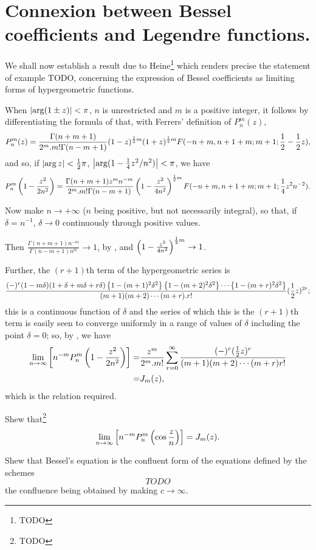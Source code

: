 \documentclass{book}
\begin{document}
\section{Connexion between Bessel coefficients and Legendre
  functions.}
We shall now establish a result due to Heine\footnote{TODO} which
renders precise the statement of  example
TODO, concerning the expression of Bessel coefficients as limiting
forms of hypergeometric functions.

When $\left| \arg(1\pm z) \right| < \pi$, $n$ is unrestricted and $m$ is a
positive integer, it follows by differentiating the formula of
 that, with Ferrers' definition of
$P_n^{m}(z)$,
$$
P_n^{m}(z)
=
\frac{\Gamma(n+m+1)}{2^m . m! \Gamma(n-m+1)}
(1-z)^{\frac{1}{2} m}
(1+z)^{\frac{1}{2} m}
F(-n+m,n+1+m; m+1; \frac{1}{2} - \frac{1}{2} z),
$$
and so, if $\left| \arg z \right| < \frac{1}{2}\pi$,
$\left| \arg (1 - \frac{1}{4} z^2/n^2) \right| < \pi$, we have
$$
P_n^{m}\left( 1 - \frac{z^2}{2n^2} \right)
=
\frac{\Gamma(n+m+1) z^m n^{-m}}{2^m . m! \Gamma(n-m+1)}
\left( 1 - \frac{z^2}{4n^2} \right)^{\frac{1}{2} m}
F(-n+m,n+1+m;m+1; \frac{1}{4} z^2 n^{-2}).
$$

Now make $n \rightarrow +\infty$ ($n$ being positive, but not
necessarily integral), so that, if $\delta = n^{-1}$, 
$\delta \rightarrow 0$ continuously through positive values.

Then
$ \frac{\Gamma(n+m+1)n^{-m}}{\Gamma(n-m+1) n^m} \rightarrow 1$,
by , and
$ \left( 1 - \frac{z^2}{4n^2} \right)^{\frac{1}{2} m} \rightarrow 1$.

Further, the $(r+1)$th term of the hypergeometric series is
$$
\frac{
  (-)^r
  (1-m\delta)
  (1+\delta+m\delta+r\delta)
  \left\{  1 - (m+1)^2 \delta^2  \right\}
  \left\{  1 - (m+2)^2 \delta^2  \right\}
  \cdots
  \left\{  1 - (m+r)^2 \delta^2  \right\}
}{ (m+1)(m+2)\cdots(m+r).r!}
(\frac{1}{2} z)^{2r};
$$
this is a continuous function of $\delta$ and the series of which this
is the $(r+1)$th term is easily seen to converge uniformly in a range
of values of $\delta$ including the point $\delta=0$; so, by
, we have
\begin{align*}
  \lim_{n \rightarrow \infty}
  \left[  n^{-m} P_n^{m}\left( 1 - \frac{z^2}{2n^2} \right) \right]
  =& \frac{z^m}{2^m.m!}
  \sum_{r=0}^{\infty} \frac{(-)^r (\frac{1}{2}
    z)^r}{(m+1)(m+2)\cdots(m+r)r!} \\
  =& J_m(z),
\end{align*}
which is the relation required.
\begin{wandwexample}
  Shew that\footnote{TODO}
  $$
  \lim_{n\rightarrow\infty}
  \left[  n^{-m} P_n^{m}\left( \cos \frac{z}{n} \right) \right] = J_m(z).
  $$
\end{wandwexample}
%
%
\begin{wandwexample}
  Shew that Bessel's equation is the confluent form of the equations
  defined by the schemes
  $$
  TODO
  $$
  the confluence being obtained by making $c \rightarrow \infty$.
\end{wandwexample}
\end{document}
